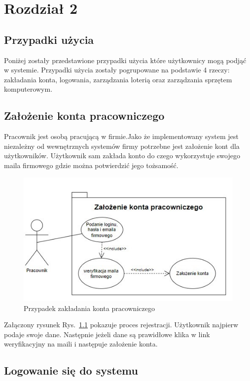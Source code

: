 \chapter{Rozdział 2}
\section{Przypadki użycia}
Poniżej zostały przedstawione przypadki użycia które użytkownicy mogą podjąć w systemie. Przypadki użycia zostały pogrupowane na podstawie 4 rzeczy: zakładania konta, logowania, zarządzania loterią oraz zarządzania sprzętem komputerowym.

\section{Założenie konta pracowniczego}
Pracownik jest osobą pracującą w firmie.Jako że implementowany system jest niezależny od wewnętrznych systemów firmy potrzebne jest założenie kont dla użytkowników. Użytkownik sam zakłada konto do czego wykorzystuje swojego maila firmowego gdzie można potwierdzić jego tożsamość.

\begin{figure}[h]
    \includegraphics{rys01/zakladanie.jpg}
    \caption{Przypadek zakładania konta pracowniczego}
    \label{zakładanie_konta_etykieta}
\end{figure}

Załączony rysunek Rys.~\ref{zakładanie_konta_etykieta} pokazuje proces rejestracji. Użytkownik najpierw podaje swoje dane. Następnie jeżeli dane są prawidłowe klika w link weryfikacyjny na maili i następuje założenie konta.

\section{Logowanie się do systemu}

